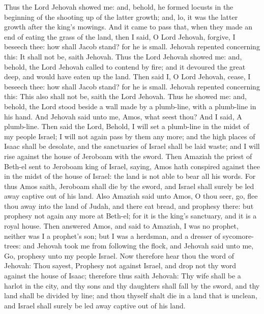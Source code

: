 Thus the Lord Jehovah showed me: and, behold, he formed locusts in the beginning of the shooting up of the latter growth; and, lo, it was the latter growth after the king’s mowings. And it came to pass that, when they made an end of eating the grass of the land, then I said, O Lord Jehovah, forgive, I beseech thee: how shall Jacob stand? for he is small. Jehovah repented concerning this: It shall not be, saith Jehovah.  Thus the Lord Jehovah showed me: and, behold, the Lord Jehovah called to contend by fire; and it devoured the great deep, and would have eaten up the land. Then said I, O Lord Jehovah, cease, I beseech thee: how shall Jacob stand? for he is small. Jehovah repented concerning this: This also shall not be, saith the Lord Jehovah.  Thus he showed me: and, behold, the Lord stood beside a wall made by a plumb-line, with a plumb-line in his hand. And Jehovah said unto me, Amos, what seest thou? And I said, A plumb-line. Then said the Lord, Behold, I will set a plumb-line in the midst of my people Israel; I will not again pass by them any more; and the high places of Isaac shall be desolate, and the sanctuaries of Israel shall be laid waste; and I will rise against the house of Jeroboam with the sword.  Then Amaziah the priest of Beth-el sent to Jeroboam king of Israel, saying, Amos hath conspired against thee in the midst of the house of Israel: the land is not able to bear all his words. For thus Amos saith, Jeroboam shall die by the sword, and Israel shall surely be led away captive out of his land. Also Amaziah said unto Amos, O thou seer, go, flee thou away into the land of Judah, and there eat bread, and prophesy there: but prophesy not again any more at Beth-el; for it is the king’s sanctuary, and it is a royal house.  Then answered Amos, and said to Amaziah, I was no prophet, neither was I a prophet’s son; but I was a herdsman, and a dresser of sycomore-trees: and Jehovah took me from following the flock, and Jehovah said unto me, Go, prophesy unto my people Israel. Now therefore hear thou the word of Jehovah: Thou sayest, Prophesy not against Israel, and drop not thy word against the house of Isaac; therefore thus saith Jehovah: Thy wife shall be a harlot in the city, and thy sons and thy daughters shall fall by the sword, and thy land shall be divided by line; and thou thyself shalt die in a land that is unclean, and Israel shall surely be led away captive out of his land. 

